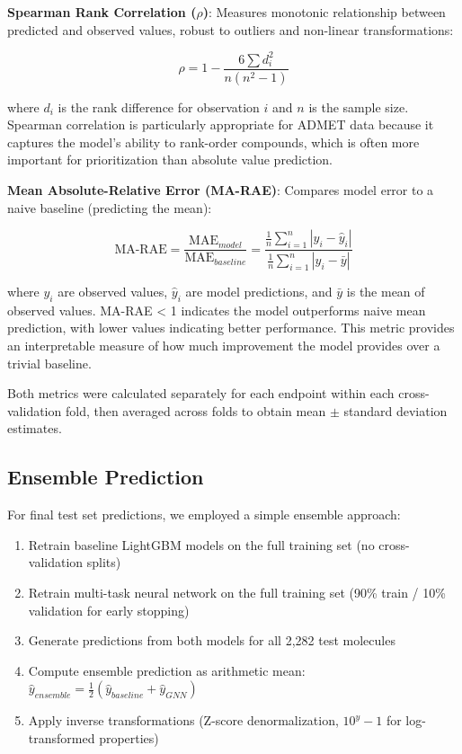 \documentclass[11pt,a4paper]{article}
\begin{document}
\textbf{Spearman Rank Correlation ($\rho$)}: Measures monotonic relationship between predicted and observed values, robust to outliers and non-linear transformations:

\begin{equation}
\rho = 1 - \frac{6 \sum d_i^2}{n(n^2-1)}
\end{equation}

where $d_i$ is the rank difference for observation $i$ and $n$ is the sample size. Spearman correlation is particularly appropriate for ADMET data because it captures the model's ability to rank-order compounds, which is often more important for prioritization than absolute value prediction.

\textbf{Mean Absolute-Relative Error (MA-RAE)}: Compares model error to a naive baseline (predicting the mean):

\begin{equation}
\text{MA-RAE} = \frac{\text{MAE}_{model}}{\text{MAE}_{baseline}} = \frac{\frac{1}{n}\sum_{i=1}^n |y_i - \hat{y}_i|}{\frac{1}{n}\sum_{i=1}^n |y_i - \bar{y}|}
\end{equation}

where $y_i$ are observed values, $\hat{y}_i$ are model predictions, and $\bar{y}$ is the mean of observed values. MA-RAE < 1 indicates the model outperforms naive mean prediction, with lower values indicating better performance. This metric provides an interpretable measure of how much improvement the model provides over a trivial baseline.

Both metrics were calculated separately for each endpoint within each cross-validation fold, then averaged across folds to obtain mean $\pm$ standard deviation estimates.

\subsection{Ensemble Prediction}

For final test set predictions, we employed a simple ensemble approach:

\begin{enumerate}
    \item Retrain baseline LightGBM models on the full training set (no cross-validation splits)
    \item Retrain multi-task neural network on the full training set (90\% train / 10\% validation for early stopping)
    \item Generate predictions from both models for all 2,282 test molecules
    \item Compute ensemble prediction as arithmetic mean: $\hat{y}_{ensemble} = \frac{1}{2}(\hat{y}_{baseline} + \hat{y}_{GNN})$
    \item Apply inverse transformations (Z-score denormalization, $10^{y}-1$ for log-transformed properties)
\end{enumerate}
\end{document}

